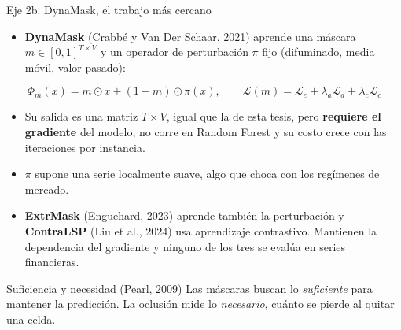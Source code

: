 \documentclass{beamer}
\begin{document}
\begin{frame}{Eje 2b. DynaMask, el trabajo más cercano}
    \footnotesize
    \begin{itemize}
        \item \textbf{DynaMask} (Crabbé y Van Der Schaar, 2021) aprende una
        máscara $m\in[0,1]^{T\times V}$ y un operador de perturbación
        $\pi$ fijo (difuminado, media móvil, valor pasado):
    \end{itemize}
    \[
        \Phi_m(x)=m\odot x+(1-m)\odot\pi(x),\qquad
        \mathcal{L}(m)=\mathcal{L}_e+\lambda_a\mathcal{L}_a+\lambda_c\mathcal{L}_c
    \]
    \begin{itemize}
        \item Su salida es una matriz $T\times V$, igual que la de esta
        tesis, pero \textbf{requiere el gradiente} del modelo, no corre en
        Random Forest y su costo crece con las iteraciones por instancia.
        \item $\pi$ supone una serie localmente suave, algo que choca con
        los regímenes de mercado.
        \item \textbf{ExtrMask} (Enguehard, 2023) aprende también la
        perturbación y \textbf{ContraLSP} (Liu et al., 2024) usa
        aprendizaje contrastivo. Mantienen la dependencia del gradiente y
        ninguno de los tres se evalúa en series financieras.
    \end{itemize}
    \begin{alertblock}{Suficiencia y necesidad (Pearl, 2009)}
        Las máscaras buscan lo \emph{suficiente} para mantener la
        predicción. La oclusión mide lo \emph{necesario}, cuánto se pierde
        al quitar una celda.
    \end{alertblock}
\end{frame}
\end{document}
